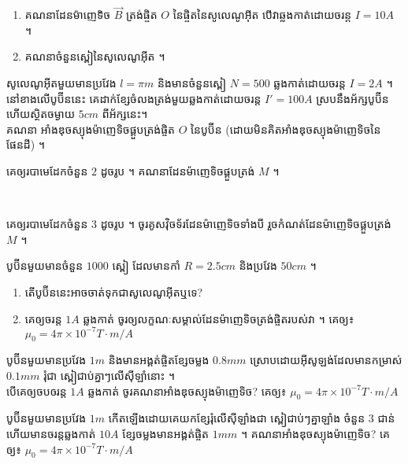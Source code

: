 \documentclass[12pt, a4paper]{article}
\begin{document}
\begin{enumerate}[m]
\begin{minipage}{0.60\textwidth}
	\begin{enumerate}[k]
		\item គណនាដែនម៉ាញេទិច $\vec{B}$ ត្រង់ផ្ចិត $O$ នៃផ្ចិតនៃសូលេណូអ៊ីត បើវាឆ្លងកាត់ដោយចរន្ត $I=10A$ ។
		\item គណនាចំនួនស្ពៀនៃសូលេណូអ៊ីត ។
	\end{enumerate}
	\end{minipage}
	\item សូលេណូអ៊ីតមួយមានប្រវែង $l=\pi m$ និងមានចំនួនស្ពៀ $N=500$ ឆ្លងកាត់ដោយចរន្ត $I=2A$ ។ នៅខាងលើបូប៊ីននេះ គេដាក់ខ្សែចំលងត្រង់មួយឆ្លងកាត់ដោយចរន្ត $I'=100A$ ស្របនឹងអ័ក្សបូប៊ីន ហើយស្ថិតចម្ងាយ $5cm$ ពីអ័ក្សនេះ។ \\
	គណនា អាំងឌុចស្យុងម៉ាញេទិចផ្គួបត្រង់ផ្ចិត $O$ នៃបូប៊ីន (ដោយមិនគិតអាំងឌុចស្យុងម៉ាញេទិចនៃផែនដី) ។\\
	\begin{minipage}{0.60\textwidth}
		\item គេឲ្យរបាមេដែកចំនួន $2$ ដូចរូប ។ គណនាដែនម៉ាញេទិចផ្គួបត្រង់
		$M$ ។
	\end{minipage}\\
	\begin{minipage}{0.60\textwidth}
		\item គេឲ្យរបាមេដែកចំនួន $3$ ដូចរូប ។ ចូរគូសវ៉ិចទ័រដែនម៉ាញេទិចទាំងបី រួចកំណត់ដែនម៉ាញេទិចផ្គួបត្រង់
		$M$ ។
	\end{minipage}
	\item បូប៊ីនមួយមានចំនួន $1000$ ស្ពៀ ដែលមានកាំ $R=2.5cm$ និងប្រវែង $50cm$ ។
	\begin{enumerate}[k]
		\item តើបូប៊ីននេះអាចចាត់ទុកជាសូលេណូអ៊ីតឬទេ?
		\item គេឲ្យចរន្ត $1A$ ឆ្លងកាត់ ចូរឲ្យលក្ខណៈសម្គាល់ដែនម៉ាញេទិចត្រង់ផ្ចិតរបស់វា ។ គេឲ្យ៖ $\mu_0=4\pi\times10^{-7}T\cdot m/A$
	\end{enumerate}
	\item បូប៊ីនមួយមានប្រវែង $1m$ និងមានអង្គត់ផ្ចិតខ្សែចម្លង $0.8mm$ ស្រោបដោយអ៊ីសូឡង់ដែលមានកម្រាស់ $0.1mm$ រុំជា ស្ពៀជាប់គ្នាៗលើស៊ីឡាំនោះ ។\\
	បើគេឲ្យចបឲរន្ត $1A$ ឆ្លងកាត់ ចូរគណនាអាំងឌុចស្យុងម៉ាញេទិច? គេឲ្យ៖ $\mu_0=4\pi\times10^{-7}T\cdot m/A$
	\item បូប៊ីនមួយមានប្រវែង $1m$  កើតឡើងដោយគេយកខ្សែរុំលើស៊ីឡាំងជា ស្ពៀជាប់ៗគ្នាឡាំង ចំនួន $3$ ជាន់ ហើយមានចរន្តឆ្លងកាត់ $10A$ ខ្សែចម្លងមានអង្គត់ផ្ចិត $1mm$ ។ គណនាអាំងឌុចស្យុងម៉ាញេទិច? គេឲ្យ៖ $\mu_0=4\pi\times10^{-7}T\cdot m/A$

\end{enumerate}
\end{document}
